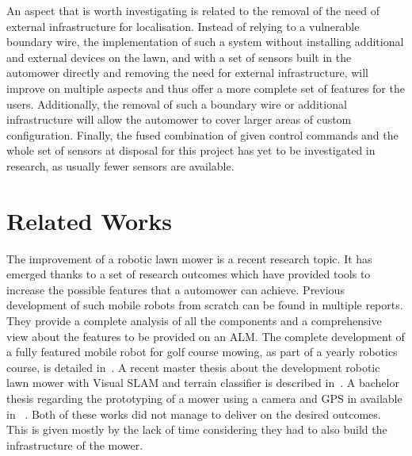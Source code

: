 An aspect that is worth investigating is related to the removal of the need of external infrastructure for localisation. 
Instead of relying to a vulnerable boundary wire, the implementation of such a system without installing additional and external devices on the lawn, and with a set of sensors built in the automower directly and removing the need for external infrastructure, will improve on multiple aspects and thus offer a more complete set of features for the users. 
Additionally, the removal of such a boundary wire or additional infrastructure will allow the automower to cover larger areas of custom configuration. Finally, the fused combination of given control commands and the whole set of sensors at disposal for this project has yet to be investigated in research, as usually fewer sensors are available. 





\section{Related Works}

\noindent 
The improvement of a robotic lawn mower is a recent research topic. It has emerged thanks to a set of research outcomes which have provided tools to increase the possible features that a automower can achieve.
Previous development of such mobile robots from scratch can be found in multiple reports.
They provide a complete analysis of all the components and a comprehensive view about the features to be provided on an \gls{ALM}.
The complete development of a fully featured mobile robot for golf course mowing, as part of a yearly robotics course, is detailed in~\cite{noauthor_groundsbot_nodate}.
A recent master thesis about the development robotic lawn mower with Visual SLAM and terrain classifier is described in~\cite{lukas_robotic_2020}.
A bachelor thesis regarding the prototyping of a mower using a camera and GPS in available in~ \cite{andersson_smart_2018}.
Both of these works did not manage to deliver on the desired outcomes. This is given mostly by the lack of time considering they had to also build the infrastructure of the mower.

